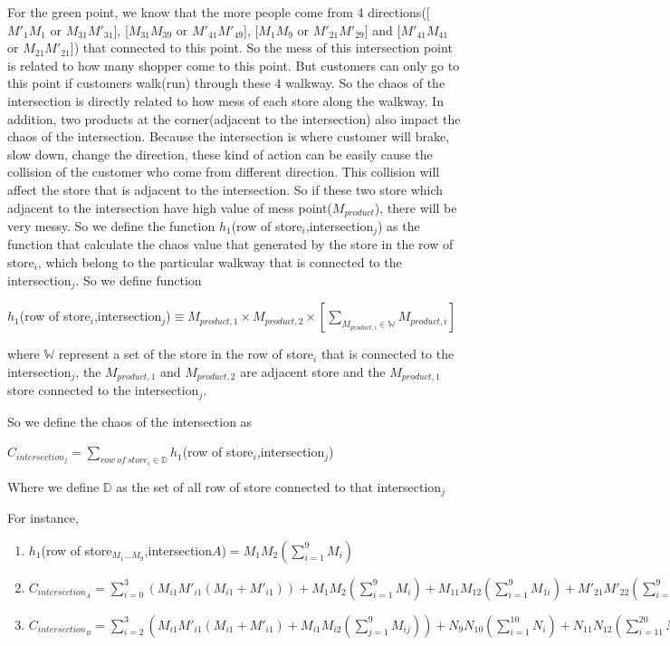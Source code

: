 For the green point, we know that the more people come from 4 directions([$M'_1M_1$ or $M_{31}M'_{31}$], [$M_{31}M_{39}$ or $M'_{41}M'_{49}$], [$M_1M_9$ or $M'_{21}M'_{29}$] and [$M'_{41}M_{41}$ or $M_{21}M'_{21}$]) that connected to this point. So the mess of this intersection point is related to how many shopper come to this point. But customers can only go to this point if customers walk(run) through these 4 walkway. So the chaos of the intersection is directly related to how mess of each store along the walkway. In addition, two products at the corner(adjacent to the intersection) also impact the chaos of the intersection. Because the intersection is where customer will brake, slow down, change the direction, these kind of action can be easily cause the collision of the customer who come from different direction. This collision will affect the store that is adjacent to the intersection. So if these two store which adjacent to the intersection have high value of mess point($M_{product}$), there will be very messy. So we define the function $h_1$(row of store$_i$,intersection$_j$) as the function that calculate the chaos value that generated by the store in the row of store$_i$, which belong to the particular walkway that is connected to the intersection$_j$.
So we define function
\begin{definition}
$h_1$(row  of store$_i$,intersection$_j$)$\equiv \displaystyle{M_{product,1} \times M_{product,2} \times [{\sum_{M_{product,i}\in \mathbb{W}} M_{product,i}}]}$
\end{definition}
\par where $\mathbb{W}$ represent a set of the store in the row of store$_i$ that is connected to the intersection$_j$, the $M_{product,1}$ and $ M_{product,2}$ are adjacent store and the $M_{product,1}$ store connected to the intersection$_j$.

So we define the chaos of the intersection as 

\begin{model}
    $C_{intersection_j}=\displaystyle{\sum_{row\ of\ store_i\in \mathbb{D}}} h_1$(row of store$_i$,intersection$_j$)
\end{model}

Where we define $\mathbb{D}$ as the set of all row of store connected to that intersection$_j$ 

For instance,
\begin{enumerate}
    \item[] $h_1$(row of store$_{M_1...M_9}$,intersection$A$)$=M_1M_2(\sum_{i=1}^{9}M_i)$
    \item[] $C_{intersection_A}=\sum_{i=0}^{3}(M_{i1}M'_{i1}(M_{i1}+M'_{i1})) + M_1M_2(\sum_{i=1}^{9}M_i) + M_{11}M_{12}(\sum_{i=1}^{9}M_{1i}) + M'_{21}M'_{22}(\sum_{i=1}^{9}M'_{2i}) + M'_{31}M'_{32}(\sum_{i=1}^{9}M'_{3i})$
    \item[] $C_{intersection_B}=\sum_{i=2}^{3}(M_{i1}M'_{i1}(M_{i1}+M'_{i1}) + M_{i1}M_{i2}(\sum_{j=1}^{9}M_{ij})) + N_9N_{10}(\sum_{i=1}^{10}N_i) + N_{11}N_{12}(\sum_{i=11}^{20}N_i)$
\end{enumerate}


